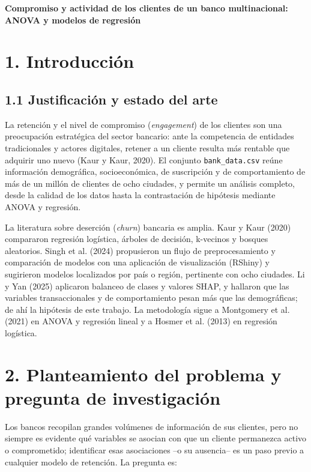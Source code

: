\documentclass[a4,11pt]{aleph-notas}
\begin{document}
\encabezado
\renewcommand{\tablename}{Tabla}
\renewcommand{\figurename}{Figura}
\linespread{1.15}\selectfont

\begin{center}
\textbf{\large Compromiso y actividad de los clientes de un banco multinacional: ANOVA y modelos de regresión}
\end{center}

\section*{1. Introducción}

\subsection*{1.1 Justificación y estado del arte}
La retención y el nivel de compromiso (\emph{engagement}) de los clientes son una preocupación estratégica del sector bancario: ante la competencia de entidades tradicionales y actores digitales, retener a un cliente resulta más rentable que adquirir uno nuevo (Kaur y Kaur, 2020). El conjunto \texttt{bank\_data.csv} reúne información demográfica, socioeconómica, de suscripción y de comportamiento de más de un millón de clientes de ocho ciudades, y permite un análisis completo, desde la calidad de los datos hasta la contrastación de hipótesis mediante ANOVA y regresión.

La literatura sobre deserción (\emph{churn}) bancaria es amplia. Kaur y Kaur (2020) compararon regresión logística, árboles de decisión, k-vecinos y bosques aleatorios. Singh et al. (2024) propusieron un flujo de preprocesamiento y comparación de modelos con una aplicación de visualización (RShiny) y sugirieron modelos localizados por país o región, pertinente con ocho ciudades. Li y Yan (2025) aplicaron balanceo de clases y valores SHAP, y hallaron que las variables transaccionales y de comportamiento pesan más que las demográficas; de ahí la hipótesis de este trabajo. La metodología sigue a Montgomery et al. (2021) en ANOVA y regresión lineal y a Hosmer et al. (2013) en regresión logística.

\section*{2. Planteamiento del problema y pregunta de investigación}
Los bancos recopilan grandes volúmenes de información de sus clientes, pero no siempre es evidente qué variables se asocian con que un cliente permanezca activo o comprometido; identificar esas asociaciones --o su ausencia-- es un paso previo a cualquier modelo de retención. La pregunta es:
\end{document}
